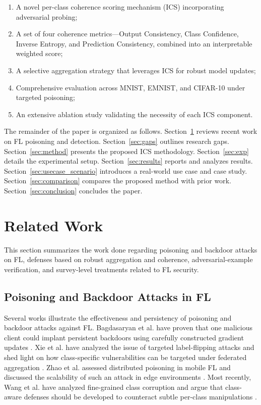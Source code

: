 \documentclass[conference]{IEEEtran}
\begin{document}
\begin{enumerate}[leftmargin=*]
  \item A novel per-class coherence scoring mechanism (ICS) incorporating adversarial probing;
  \item A set of four coherence metrics—Output Consistency, Class Confidence, Inverse Entropy, and Prediction Consistency, combined into an interpretable weighted score;
  \item A selective aggregation strategy that leverages ICS for robust model updates;
  \item Comprehensive evaluation across MNIST, EMNIST, and CIFAR-10 under targeted poisoning;
  \item An extensive ablation study validating the necessity of each ICS component.
\end{enumerate}
The remainder of the paper is organized as follows. Section~\ref{sec:related} reviews recent work on FL poisoning and detection. Section~\ref{sec:gaps} outlines research gaps. Section~\ref{sec:method} presents the proposed ICS methodology. Section~\ref{sec:exp} details the experimental setup. Section~\ref{sec:results} reports and analyzes results. Section~\ref{sec:usecase_scenario} introduces a real-world use case and case study. Section~\ref{sec:comparison} compares the proposed method with prior work. Section~\ref{sec:conclusion} concludes the paper.
\section{Related Work}
\label{sec:related}

This section summarizes the work done regarding poisoning and backdoor attacks on FL, defenses based on robust aggregation and coherence, adversarial-example verification, and survey-level treatments related to FL security.

\subsection{Poisoning and Backdoor Attacks in FL}
Several works illustrate the effectiveness and persistency of poisoning and backdoor attacks against FL. Bagdasaryan et al. have proven that one malicious client could implant persistent backdoors using carefully constructed gradient updates \cite{bagdasaryan2020backdoor}. Xie et al. have analyzed the issue of targeted label-flipping attacks and shed light on how class-specific vulnerabilities can be targeted under federated aggregation \cite{xie2021targeted}. Zhao et al. assessed distributed poisoning in mobile FL and discussed the scalability of such an attack in edge environments \cite{zhao2023distributed}. Most recently, Wang et al. have analyzed fine-grained class corruption and argue that class-aware defenses should be developed to counteract subtle per-class manipulations \cite{wang2024class}.
\end{document}
